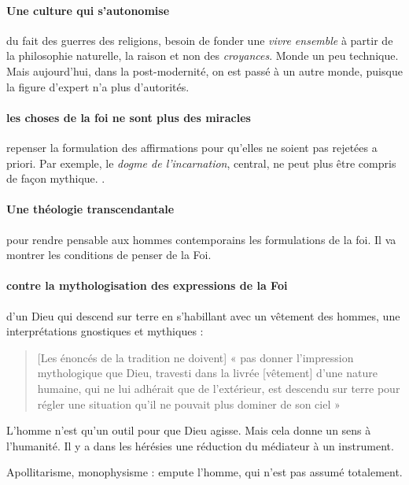 \paragraph{Une culture qui s'autonomise} du fait des guerres des religions, besoin de fonder une \textit{vivre ensemble} à partir de la philosophie naturelle, la raison et non des \textit{croyances}. Monde un peu technique. Mais aujourd'hui, dans la post-modernité, on est passé à un autre monde, puisque la figure d'expert n'a plus d'autorités.


\paragraph{les choses de la foi ne sont plus des miracles} repenser la formulation des affirmations pour qu'elles ne soient pas rejetées a priori. Par exemple, le \textit{dogme de l'incarnation}, central, ne peut plus être compris de façon mythique. .

\paragraph{Une théologie transcendantale} pour rendre pensable aux hommes contemporains les formulations de la foi. Il va montrer les conditions de penser de la Foi.

\paragraph{contre la mythologisation des expressions de la Foi} d'un Dieu qui descend sur terre en s'habillant avec un vêtement des hommes, une interprétations gnostiques et mythiques :

\begin{quote}
    [Les énoncés de la tradition ne doivent] « pas donner l’impression mythologique que Dieu, travesti dans la livrée [vêtement] d’une nature humaine, qui ne lui adhérait que de l’extérieur,  est descendu sur terre pour régler une situation qu’il ne pouvait plus dominer de son ciel » 
\end{quote}
L'homme n'est qu'un outil pour que Dieu agisse. Mais cela donne un sens à l'humanité. Il y a dans les hérésies une réduction du médiateur à un instrument.

Apollitarisme, monophysisme : empute l'homme, qui n'est pas assumé totalement.

